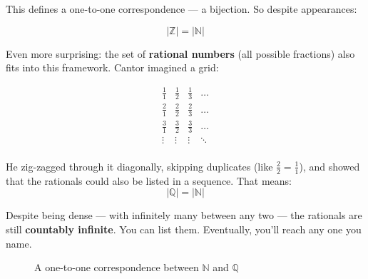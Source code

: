 This defines a one-to-one correspondence — a bijection. So despite appearances:

\[
|\mathbb{Z}| = |\mathbb{N}|
\]

\medskip

Even more surprising: the set of \textbf{rational numbers} (all possible fractions) also fits into this framework. Cantor imagined a grid:

\[
\begin{matrix}
\frac{1}{1} & \frac{1}{2} & \frac{1}{3} & \dots \\
\frac{2}{1} & \frac{2}{2} & \frac{2}{3} & \dots \\
\frac{3}{1} & \frac{3}{2} & \frac{3}{3} & \dots \\
\vdots & \vdots & \vdots & \ddots \\
\end{matrix}
\]

He zig-zagged through it diagonally, skipping duplicates (like \( \frac{2}{2} = \frac{1}{1} \)), and showed that the rationals could also be listed in a sequence. That means:
\[
|\mathbb{Q}| = |\mathbb{N}|
\]

Despite being dense — with infinitely many between any two — the rationals are still \textbf{countably infinite}. You can list them. Eventually, you’ll reach any one you name.

\medskip

\begin{figure}[H]
\centering
{}
\caption{A one-to-one correspondence between $\mathbb{N}$ and $\mathbb{Q}$}
\end{figure}

